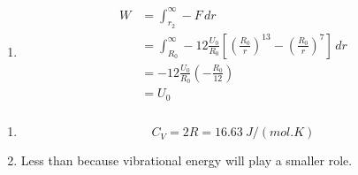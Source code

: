 \documentclass{article}
\begin{document}
\begin{enumerate}
  \item

        \begin{align*}
          W & = \int_{r_2}^\infty -F \,dr                                                                                                    \\
            & = \int_{R_0}^\infty -12 \frac{U_0}{R_0} \left[ \left( \frac{R_0}{r} \right)^{13} - \left( \frac{R_0}{r} \right)^7 \right] \,dr \\
            & = -12 \frac{U_0}{R_0} \left( -\frac{R_0}{12} \right)                                                                           \\
            & = U_0
        \end{align*}
\end{enumerate}

\setcounter{subsubsection}{68}
\subsubsection{}

\begin{enumerate}
  \item \[C_V = 2 R = \qty{16.63}{J/(mol.K)}\]

  \item Less than because vibrational energy will play a smaller role.
\end{enumerate}

\setcounter{subsubsection}{70}
\subsubsection{}
\end{document}
